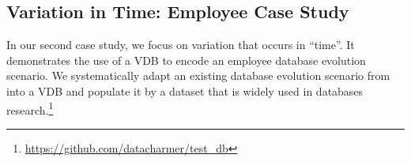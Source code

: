 \subsection{Variation in Time: Employee Case Study}
\label{sec:emp-vdb}



%
%

In our second case study, we focus on variation that occurs in ``time''.
It demonstrates the use of a VDB to encode an employee database evolution
scenario. We systematically adapt an existing database evolution scenario from
\citet{prima08Moon} into a VDB and populate it by a dataset that is widely used
in databases research.\footnote{\url{https://github.com/datacharmer/test_db}}


